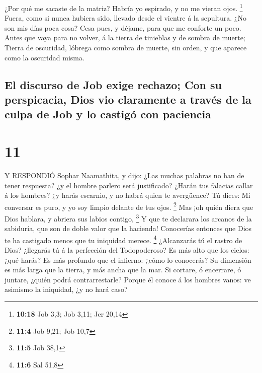  ¿Por qué me sacaste de la matriz? Habría yo espirado, y no
me vieran ojos. \footnote{\textbf{10:18} Job 3,3; Job 3,11; Jer 20,14}
 Fuera, como si nunca hubiera sido, llevado desde el
vientre á la sepultura.  ¿No son mis días poca cosa? Cesa
pues, y déjame, para que me conforte un poco.  Antes que
vaya para no volver, á la tierra de tinieblas y de sombra de muerte;
 Tierra de oscuridad, lóbrega como sombra de muerte, sin
orden, y que aparece como la oscuridad misma.

\hypertarget{el-discurso-de-job-exige-rechazo-con-su-perspicacia-dios-vio-claramente-a-travuxe9s-de-la-culpa-de-job-y-lo-castiguxf3-con-paciencia}{%
\subsection{El discurso de Job exige rechazo; Con su perspicacia, Dios
vio claramente a través de la culpa de Job y lo castigó con
paciencia}\label{el-discurso-de-job-exige-rechazo-con-su-perspicacia-dios-vio-claramente-a-travuxe9s-de-la-culpa-de-job-y-lo-castiguxf3-con-paciencia}}

\hypertarget{section-10}{%
\section{11}\label{section-10}}

 Y RESPONDIÓ Sophar Naamathita, y dijo:  ¿Las
muchas palabras no han de tener respuesta? ¿y el hombre parlero será
justificado?  ¿Harán tus falacias callar á los hombres? ¿y
harás escarnio, y no habrá quien te avergüence?  Tú dices:
Mi conversar es puro, y yo soy limpio delante de tus ojos. \footnote{\textbf{11:4}
  Job 9,21; Job 10,7}  Mas ¡oh quién diera que Dios hablara,
y abriera sus labios contigo, \footnote{\textbf{11:5} Job 38,1}
 Y que te declarara los arcanos de la sabiduría, que son de
doble valor que la hacienda! Conocerías entonces que Dios te ha
castigado menos que tu iniquidad merece. \footnote{\textbf{11:6} Sal
  51,8}  ¿Alcanzarás tú el rastro de Dios? ¿llegarás tú á la
perfección del Todopoderoso?  Es más alto que los cielos:
¿qué harás? Es más profundo que el infierno: ¿cómo lo conocerás?
 Su dimensión es más larga que la tierra, y más ancha que la
mar.  Si cortare, ó encerrare, ó juntare, ¿quién podrá
contrarrestarle?  Porque él conoce á los hombres vanos: ve
asimismo la iniquidad, ¿y no hará caso?

